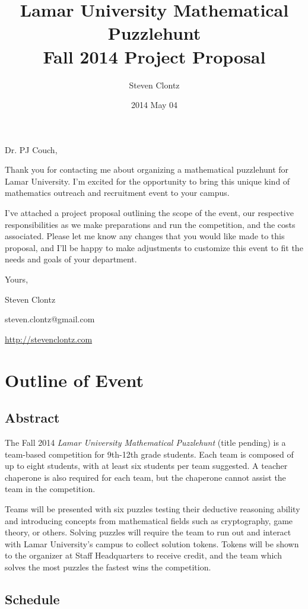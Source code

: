 \documentclass[11pt,letterpaper]{article}
\title{
  Lamar University Mathematical Puzzlehunt \\
  Fall 2014 Project Proposal
}
\author{Steven Clontz}
\date{2014 May 04}
\makeatletter
\newcommand{\signature}{
  \noindent\hspace{3.5in}Yours,

  \noindent\hspace{3.5in}Steven Clontz

  \vspace{-1em}
  \noindent\hspace{3.5in}steven.clontz@gmail.com

  \vspace{-1em}
  \noindent\hspace{3.5in}\url{http://stevenclontz.com}
}
\newcommand{\salutationTo}[1]{\noindent #1,}
\makeatother
\begin{document}
\maketitle


\salutationTo{Dr. PJ Couch}

Thank you for contacting me about organizing a mathematical puzzlehunt for
Lamar University. I'm excited for the opportunity to bring this unique kind
of mathematics outreach and recruitment event to your campus.

I've attached a project proposal outlining the scope of the event, our
respective responsibilities as we make preparations and run the competition, 
and the costs associated. Please let me know any changes that you would
like made to this proposal, and I'll be happy to make adjustments to customize
this event to fit the needs and goals of your department.

\signature



\newpage

\section{Outline of Event}

\subsection{Abstract}

The Fall 2014 \textit{Lamar University Mathematical Puzzlehunt} (title pending)
is a team-based
competition for 9th-12th grade students. Each team is composed of up to
eight students, with at least six students per team suggested. A teacher
chaperone is also required for each team, but the chaperone cannot assist
the team in the competition.

Teams will be presented with six puzzles testing their deductive reasoning
ability and introducing concepts from mathematical fields such as cryptography, 
game theory, or others. Solving puzzles will require the team to run out and
interact with Lamar University's campus to collect solution tokens. Tokens will 
be shown to the organizer at Staff Headquarters to receive credit, and the team 
which solves the most puzzles the fastest wins the competition.

\subsection{Schedule}
\end{document}
